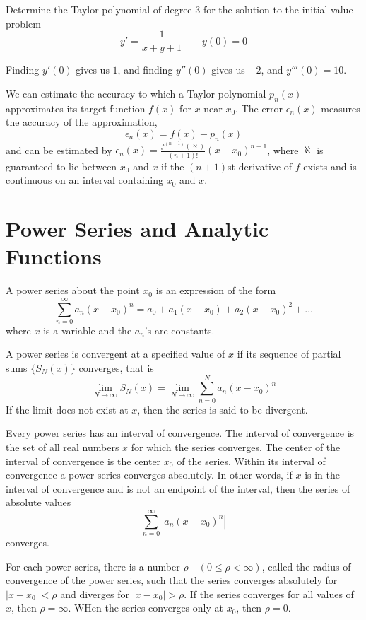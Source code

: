 \documentclass[../diffeq.tex]{subfiles}
\begin{document}
\begin{example}
    Determine the Taylor polynomial of degree $3$ for the solution to the initial value problem 
    \[ y' = \frac{1}{x+y+1} \qquad y(0)=0 \]

    Finding $y'(0)$ gives us $1$, and finding $y''(0)$ gives us $-2$, and $y'''(0)=10$.
\end{example}

We can estimate the accuracy to which a Taylor polynomial $p_n(x)$ approximates its target function $f(x)$ for $x$ near $x_0$. The error $\epsilon_n(x)$ measures the accuracy of the approximation, 
\[ \epsilon_n(x)= f(x)-p_n(x) \]
and can be estimated by $\epsilon_n(x)=\frac{f^{(n+1)}(\aleph)}{(n+1)!}(x-x_0)^{n+1}$, where $\aleph$ is guaranteed to lie between $x_0$ and $x$ if the $(n+1)$st derivative of $f$ exists and is continuous on an interval containing $x_0$ and $x$.


\section{Power Series and Analytic Functions}
A power series about the point $x_0$ is an expression of the form 
\[ \sum_{n=0}^{\infty}a_n(x-x_0)^n = a_0+a_1(x-x_0)+a_2(x-x_0)^2 + \dots \]
where $x$ is a variable and the $a_n$'s are constants.

A power series is convergent at a specified value of $x$ if its sequence of partial sums $\{S_N(x)\}$ converges, that is 
\[ \lim_{N\to \infty} S_N(x)=\lim_{N\to\infty}\sum^N_{n=0}a_n(x-x_0)^n \]
If the limit does not exist at $x$, then the series is said to be divergent.

Every power series has an interval of convergence. The interval of convergence is the set of all real numbers $x$ for which the series converges. The center of the interval of convergence is the center $x_0$ of the series. Within its 
interval of convergence a power series converges absolutely. In other words, if $x$ is in the interval of convergence and is not an endpoint of the interval, then the series of absolute values 
\[ \sum_{n=0}^{\infty} \left|a_n(x-x_0)^n\right| \]
converges.

\begin{theorem}
    For each power series, there is a number $\rho \quad (0\leq \rho < \infty)$, called the radius of convergence of the power series, such that the series converges absolutely for $|x-x_0|<\rho$ and diverges for $|x-x_0|>\rho$.
    If the series converges for all values of $x$, then $\rho=\infty$. WHen the series converges only at $x_0$, then $\rho=0$.
\end{theorem}
\end{document}

